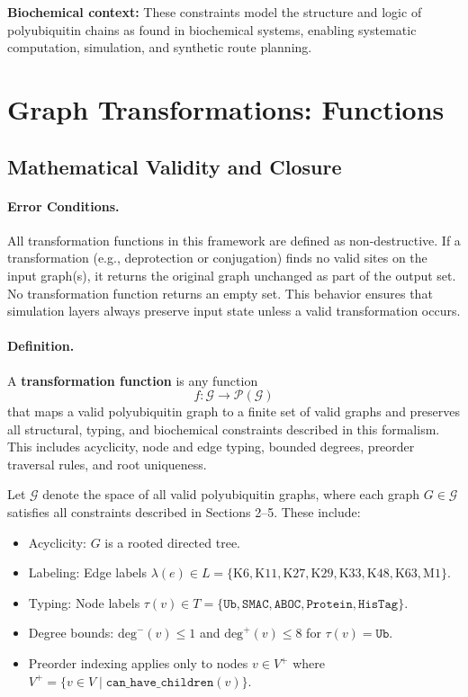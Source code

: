\documentclass[12pt]{article}
\begin{document}
\textbf{Biochemical context:} These constraints model the structure and logic of polyubiquitin chains as found in biochemical systems, enabling systematic computation, simulation, and synthetic route planning.

 \section{Graph Transformations: Functions}

 \subsection*{Mathematical Validity and Closure}

 \paragraph{Error Conditions.}
All transformation functions in this framework are defined as non-destructive. If a transformation (e.g., deprotection or conjugation) finds no valid sites on the input graph(s), it returns the original graph unchanged as part of the output set. No transformation function returns an empty set. This behavior ensures that simulation layers always preserve input state unless a valid transformation occurs.

\paragraph{Definition.}
A \textbf{transformation function} is any function
\[
f : \mathcal{G} \to \mathcal{P}(\mathcal{G})
\]
that maps a valid polyubiquitin graph to a finite set of valid graphs and preserves all structural, typing, and biochemical constraints described in this formalism. This includes acyclicity, node and edge typing, bounded degrees, preorder traversal rules, and root uniqueness.

 Let $\mathcal{G}$ denote the space of all valid polyubiquitin graphs, where each graph $G \in \mathcal{G}$ satisfies all constraints described in Sections 2--5. These include:
 \begin{itemize}
     \item Acyclicity: $G$ is a rooted directed tree.
     \item Labeling: Edge labels $\lambda(e) \in L = \{\text{K6}, \text{K11}, \text{K27}, \text{K29}, \text{K33}, \text{K48}, \text{K63}, \text{M1}\}$.
     \item Typing: Node labels $\tau(v) \in T = \{\texttt{Ub}, \texttt{SMAC}, \texttt{ABOC}, \texttt{Protein}, \texttt{HisTag}\}$.
     \item Degree bounds: $\text{deg}^-(v) \leq 1$ and $\text{deg}^+(v) \leq 8$ for $\tau(v) = \texttt{Ub}$.
     \item Preorder indexing applies only to nodes $v \in V^+$ where $V^+ = \{v \in V \mid \texttt{can\_have\_children}(v)\}$.
 \end{itemize}
\end{document}
